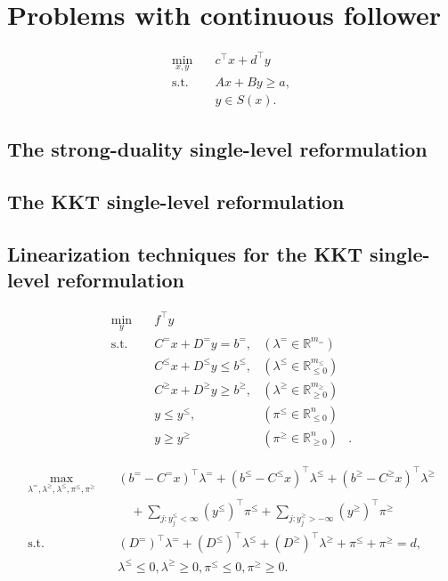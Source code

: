 \chapter{Problems with continuous follower}

\begin{subequations}
    \begin{align}
        \min_{x,y} \quad & c^\top x + d^\top y \\
        \text{s.t.} \quad & Ax + By \ge a, \\
        & y\in S(x).
    \end{align}
\end{subequations}

\section{The strong-duality single-level reformulation}

\section{The KKT single-level reformulation}

\section{Linearization techniques for the KKT single-level reformulation}

\begin{subequations}
    \begin{align}
        \min_y \quad & f^\top y \\
        \text{s.t.} \quad & C^=x + D^=y = b^=, & (\lambda^=\in\mathbb{R}^{m_=}) \\
        & C^\le x + D^\le y \le b^\le, & (\lambda^\le\in\mathbb{R}^{m_\le}_{\le 0}) \\
        & C^\ge x + D^\ge y \ge b^\ge, & (\lambda^\ge\in\mathbb{R}^{m_\ge}_{\ge 0}) \\
        & y \le y^\le, & (\pi^\le\in\mathbb{R}^{n}_{\le 0}) \\
        & y \ge y^\ge & (\pi^\ge\in\mathbb{R}^{n}_{\ge 0})&.
    \end{align}
\end{subequations}

\begin{subequations}
    \begin{align}
        \max_{ \lambda^=, \lambda^\ge, \lambda^\le, \pi^\le, \pi^\ge } \quad & 
        (b^= - C^=x)^\top\lambda^=
        + (b^\le - C^\le x)^\top\lambda^\le
        + (b^\ge - C^\ge x)^\top\lambda^\ge \\
        & \quad 
        +\sum_{j:y^\le_j < \infty} (y^\le)^\top\pi^\le
        +\sum_{j:y^\ge_j > -\infty} (y^\ge)^\top\pi^\ge \\
        \text{s.t.} \quad & (D^=)^\top\lambda^= + (D^\le)^\top\lambda^\le + (D^\ge)^\top\lambda^\ge + \pi^\le + \pi^\ge = d, \\
        & \lambda^\le \le 0, \lambda^\ge \ge 0, \pi^\le \le 0, \pi^\ge \ge 0.
    \end{align}
\end{subequations}

